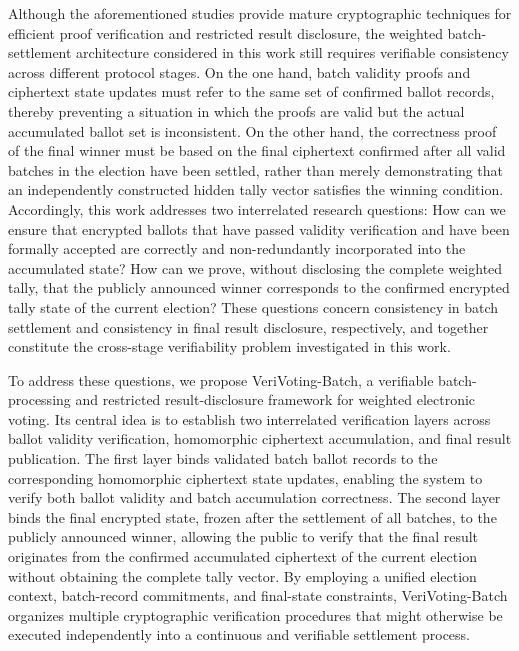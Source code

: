 \documentclass[pdflatex,sn-mathphys-num]{sn-jnl}%
\theoremstyle{thmstyleone}%
\theoremstyle{thmstyletwo}%
\theoremstyle{thmstylethree}%
\begin{document}
Although the aforementioned studies provide mature cryptographic techniques for
efficient proof verification and restricted result disclosure, the weighted
batch-settlement architecture considered in this work still requires verifiable
consistency across different protocol stages. On the one hand, batch validity proofs and
ciphertext state updates must refer to the same set of confirmed ballot records, thereby
preventing a situation in which the proofs are valid but the actual accumulated ballot
set is inconsistent. On the other hand, the correctness proof of the final winner must
be based on the final ciphertext confirmed after all valid batches in the election have
been settled, rather than merely demonstrating that an independently constructed hidden
tally vector satisfies the winning condition. Accordingly, this work addresses two
interrelated research questions: How can we ensure that encrypted ballots that
have passed validity verification and have been formally accepted are correctly and
non-redundantly incorporated into the accumulated state? How can we prove, without
disclosing the complete weighted tally, that the publicly announced winner corresponds
to the confirmed encrypted tally state of the current election? These questions concern
consistency in batch settlement and consistency in final result disclosure,
respectively, and together constitute the cross-stage verifiability problem investigated
in this work.

To address these questions, we propose VeriVoting-Batch, a verifiable batch-processing
and restricted result-disclosure framework for weighted electronic voting. Its central
idea is to establish two interrelated verification layers across ballot validity
verification, homomorphic ciphertext accumulation, and final result publication. The
first layer binds validated batch ballot records to the corresponding homomorphic
ciphertext state updates, enabling the system to verify both ballot validity and batch
accumulation correctness. The second layer binds the final encrypted state, frozen after
the settlement of all batches, to the publicly announced winner, allowing the public to
verify that the final result originates from the confirmed accumulated ciphertext of the
current election without obtaining the complete tally vector. By employing a unified
election context, batch-record commitments, and final-state constraints,
VeriVoting-Batch organizes multiple cryptographic verification procedures that might
otherwise be executed independently into a continuous and verifiable settlement process.
\end{document}
